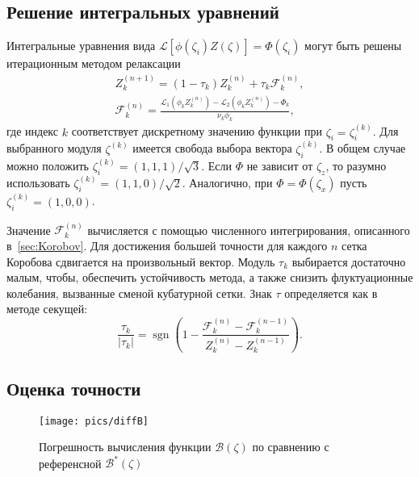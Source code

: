 \documentclass[a4paper,12pt]{article}
\DeclareMathOperator{\sgn}{sgn}
\begin{document}
\subsection{Решение интегральных уравнений}\label{sec:int_equations}

Интегральные уравнения вида \(\mathcal{L}[\phi(\zeta_i)Z(\zeta)] = \Phi(\zeta_i)\)
могут быть решены итерационным методом релаксации
\begin{gather}\label{eq:relax_method}
    Z_k^{(n+1)} = (1-\tau_k)Z_k^{(n)} + \tau_k\mathcal{F}_k^{(n)}, \\
    \mathcal{F}_k^{(n)} = \frac{\mathcal{L}_1(\phi_k Z_k^{(n)}) - \mathcal{L}_2(\phi_k Z_k^{(n)}) - \Phi_k}{\nu_k\phi_k},
\end{gather}
где индекс \(k\) соответствует дискретному значению функции при \(\zeta_i=\zeta_i^{(k)}\).
Для выбранного модуля \(\zeta^{(k)}\) имеется свобода выбора вектора \(\zeta_i^{(k)}\).
В общем случае можно положить \(\zeta_i^{(k)} = (1,1,1)/\sqrt3\).
Если \(\Phi\) не зависит от \(\zeta_z\), то разумно использовать \(\zeta_i^{(k)} = (1,1,0)/\sqrt2\).
Аналогично, при \(\Phi=\Phi(\zeta_x)\) пусть \(\zeta_i^{(k)} = (1,0,0)\).

Значение \(\mathcal{F}_k^{(n)}\) вычисляется с помощью численного интегрирования, описанного в~\ref{sec:Korobov}.
Для достижения большей точности для каждого \(n\) сетка Коробова сдвигается на произвольный вектор.
Модуль \(\tau_k\) выбирается достаточно малым, чтобы, обеспечить устойчивость метода,
а также снизить флуктуационные колебания, вызванные сменой кубатурной сетки.
Знак \(\tau\) определяется как в методе секущей:
\begin{equation}\label{eq:secant_method}
    \frac{\tau_k}{|\tau_k|} = \sgn\left(1-\frac{\mathcal{F}_k^{(n)} - \mathcal{F}_k^{(n-1)}}{Z_k^{(n)}-Z_k^{(n-1)}}\right).
\end{equation}

\subsection{Оценка точности}

\begin{figure}
    \centering
    \begin{minipage}[b]{0.5\textwidth}
        \centering
        \texttt{[image: pics/diffB]}
        \caption{Погрешность вычисления функции \(\mathcal{B}(\zeta)\)
            по сравнению с референсной \(\mathcal{B}^*(\zeta)\)}
        \label{fig:diffB}
    \end{minipage}%
    \begin{minipage}[b]{0.5\textwidth}
    \end{minipage}
\end{figure}
\end{document}
